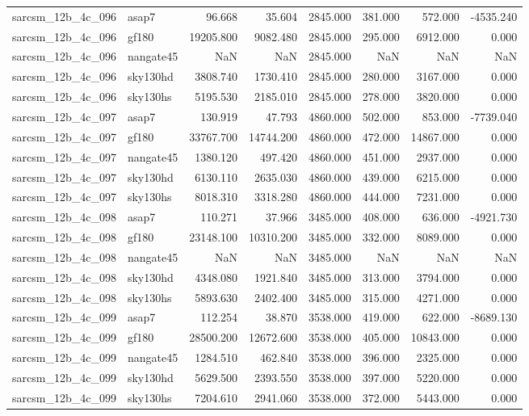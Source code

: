 \begin{tabular}{llrrrrrr}
sarcsm\_12b\_4c\_096 & asap7 & 96.668 & 35.604 & 2845.000 & 381.000 & 572.000 & -4535.240 \\
sarcsm\_12b\_4c\_096 & gf180 & 19205.800 & 9082.480 & 2845.000 & 295.000 & 6912.000 & 0.000 \\
sarcsm\_12b\_4c\_096 & nangate45 & NaN & NaN & 2845.000 & NaN & NaN & NaN \\
sarcsm\_12b\_4c\_096 & sky130hd & 3808.740 & 1730.410 & 2845.000 & 280.000 & 3167.000 & 0.000 \\
sarcsm\_12b\_4c\_096 & sky130hs & 5195.530 & 2185.010 & 2845.000 & 278.000 & 3820.000 & 0.000 \\
sarcsm\_12b\_4c\_097 & asap7 & 130.919 & 47.793 & 4860.000 & 502.000 & 853.000 & -7739.040 \\
sarcsm\_12b\_4c\_097 & gf180 & 33767.700 & 14744.200 & 4860.000 & 472.000 & 14867.000 & 0.000 \\
sarcsm\_12b\_4c\_097 & nangate45 & 1380.120 & 497.420 & 4860.000 & 451.000 & 2937.000 & 0.000 \\
sarcsm\_12b\_4c\_097 & sky130hd & 6130.110 & 2635.030 & 4860.000 & 439.000 & 6215.000 & 0.000 \\
sarcsm\_12b\_4c\_097 & sky130hs & 8018.310 & 3318.280 & 4860.000 & 444.000 & 7231.000 & 0.000 \\
sarcsm\_12b\_4c\_098 & asap7 & 110.271 & 37.966 & 3485.000 & 408.000 & 636.000 & -4921.730 \\
sarcsm\_12b\_4c\_098 & gf180 & 23148.100 & 10310.200 & 3485.000 & 332.000 & 8089.000 & 0.000 \\
sarcsm\_12b\_4c\_098 & nangate45 & NaN & NaN & 3485.000 & NaN & NaN & NaN \\
sarcsm\_12b\_4c\_098 & sky130hd & 4348.080 & 1921.840 & 3485.000 & 313.000 & 3794.000 & 0.000 \\
sarcsm\_12b\_4c\_098 & sky130hs & 5893.630 & 2402.400 & 3485.000 & 315.000 & 4271.000 & 0.000 \\
sarcsm\_12b\_4c\_099 & asap7 & 112.254 & 38.870 & 3538.000 & 419.000 & 622.000 & -8689.130 \\
sarcsm\_12b\_4c\_099 & gf180 & 28500.200 & 12672.600 & 3538.000 & 405.000 & 10843.000 & 0.000 \\
sarcsm\_12b\_4c\_099 & nangate45 & 1284.510 & 462.840 & 3538.000 & 396.000 & 2325.000 & 0.000 \\
sarcsm\_12b\_4c\_099 & sky130hd & 5629.500 & 2393.550 & 3538.000 & 397.000 & 5220.000 & 0.000 \\
sarcsm\_12b\_4c\_099 & sky130hs & 7204.610 & 2941.060 & 3538.000 & 372.000 & 5443.000 & 0.000 \\

\end{tabular}
